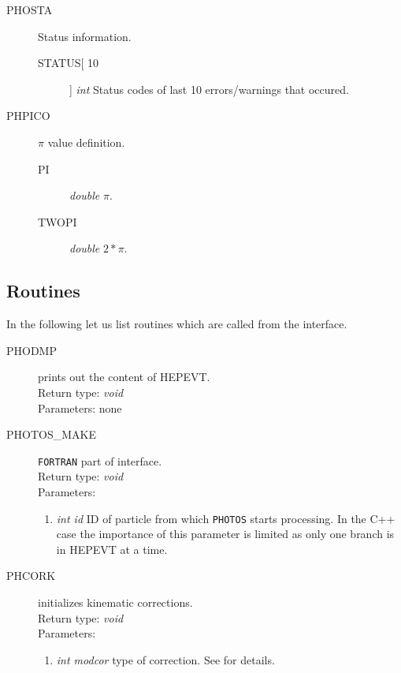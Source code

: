 \documentclass[]{Photos_interface_design}
\begin{document}
\begin{description}
\item[PHOSTA] Status information.
    \begin{description}
    \item[STATUS[ 10]]  \textit{int} Status codes of last 10 errors/warnings
    that occured.
    \end{description}
\end{description}

\begin{description}
\item[PHPICO] $\pi$ value definition.
    \begin{description}
    \item[PI]  \textit{double} $\pi$.
	\item[TWOPI]  \textit{double} $2*\pi$.
    \end{description}
\end{description}

\subsection{Routines}

In the following let us list routines which are called from the interface.

\begin{description}
\item[PHODMP] prints out the content of HEPEVT. \\
  Return type: \textit{void} \\
  Parameters: none
\end{description}

\begin{description}
\item[PHOTOS\_MAKE] {\tt FORTRAN} part of interface. \\
  Return type: \textit{void} \\
  Parameters:
  \begin{enumerate}
    \item \textit {int id} ID of particle from which {\tt PHOTOS} starts processing. In the C++ case the importance of this parameter is limited as only one branch is in HEPEVT at a time.
  \end{enumerate}
\end{description}

\begin{description}
\item[PHCORK] initializes kinematic corrections. \\
  Return type: \textit{void} \\
  Parameters:
  \begin{enumerate}
    \item \textit {int modcor} type of correction. See \cite{Golonka:2005pn}  for details.
  \end{enumerate}
\end{description}
\end{document}
